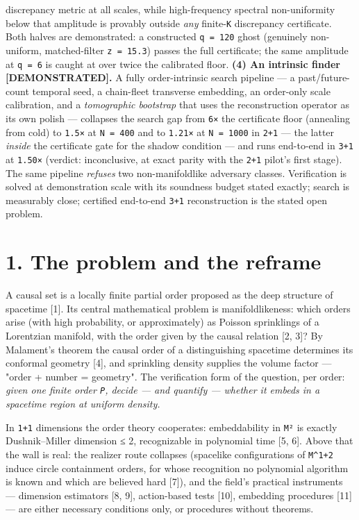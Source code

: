 \documentclass[11pt]{article}
\begin{document}
discrepancy metric at all scales, while high-frequency spectral non-uniformity below that amplitude is provably outside \emph{any} finite-\texttt{K} discrepancy certificate. Both halves are demonstrated: a constructed \texttt{q = 120} ghost (genuinely non-uniform, matched-filter \texttt{z = 15.3}) passes the full certificate; the same amplitude at \texttt{q = 6} is caught at over twice the calibrated floor. \textbf{(4) An intrinsic finder [DEMONSTRATED].} A fully order-intrinsic search pipeline — a past/future-count temporal seed, a chain-fleet transverse embedding, an order-only scale calibration, and a \emph{tomographic bootstrap} that uses the reconstruction operator as its own polish — collapses the search gap from \texttt{6×} the certificate floor (annealing from cold) to \texttt{1.5×} at \texttt{N = 400} and to \texttt{1.21×} at \texttt{N = 1000} in \texttt{2+1} — the latter \emph{inside} the certificate gate for the shadow condition — and runs end-to-end in \texttt{3+1} at \texttt{1.50×} (verdict: inconclusive, at exact parity with the \texttt{2+1} pilot's first stage). The same pipeline \emph{refuses} two non-manifoldlike adversary classes. Verification is solved at demonstration scale with its soundness budget stated exactly; search is measurably close; certified end-to-end \texttt{3+1} reconstruction is the stated open problem.

\section*{1. The problem and the reframe}
A causal set is a locally finite partial order proposed as the deep structure of spacetime [1]. Its central mathematical problem is manifoldlikeness: which orders arise (with high probability, or approximately) as Poisson sprinklings of a Lorentzian manifold, with the order given by the causal relation [2, 3]? By Malament's theorem the causal order of a distinguishing spacetime determines its conformal geometry [4], and sprinkling density supplies the volume factor — "order + number = geometry". The verification form of the question, per order: \emph{given one finite order \texttt{P}, decide — and quantify — whether it embeds in a spacetime region at uniform density.}

In \texttt{1+1} dimensions the order theory cooperates: embeddability in \texttt{M²} is exactly Dushnik–Miller dimension ≤ 2, recognizable in polynomial time [5, 6]. Above that the wall is real: the realizer route collapses (spacelike configurations of \texttt{M\textasciicircum{}{1+2}} induce circle containment orders, for whose recognition no polynomial algorithm is known and which are believed hard [7]), and the field's practical instruments — dimension estimators [8, 9], action-based tests [10], embedding procedures [11] — are either necessary conditions only, or procedures without theorems.
\end{document}

